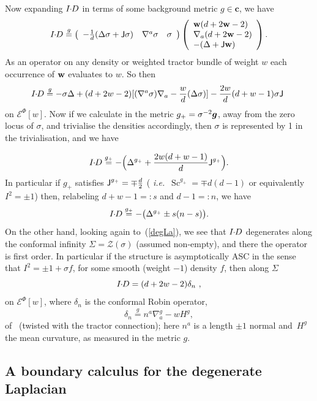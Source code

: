 \documentclass[a4paper,12pt]{amsart}
\def\g{g_+}
\def\Cal{\mathcal}
\newcommand{\J}{\mbox{\sf J}}
\newcommand{\cc}{\boldsymbol{c}}
\newcommand{\ce}{{\Cal E}}
\def\bg{\mbox{\boldmath $g$}}
\newcommand{\si}{\sigma}
\theoremstyle{remark}
\newcommand{\nn}[1]{(\ref{#1})}
\newcommand{\Sc}{\operatorname{Sc}}
\def\sideremark#1{\ifvmode\leavevmode\fi\vadjust{\vbox to0pt{\vss%
 \hbox to 0pt{\hskip\hsize\hskip1em%
 \vbox{\hsize3cm\tiny\raggedright\pretolerance10000%
  \noindent #1\hfill}\hss}\vbox to8pt{\vfil}\vss}}}%
\newcommand{\edz}[1]{\sideremark{#1}}
\begin{document}
Now expanding $I\hspace*{-1mm} \cdot \hspace*{-1mm} D$ in terms of some background metric $g\in\cc$, we have 
$$
\ID \stackrel{g}{=}
\left(\begin{array}{rrr}
-\frac{1}{d}(\Delta \si +\J\si) & \nabla^a \si & \si
\end{array}\right)
\left(\begin{array}{lll}
\w (d+2\w-2) \\  \nabla_a ( d+2\w-2) \\ -(\Delta +\J \w)
\end{array}\right).
$$
As an operator on any density or weighted tractor bundle of weight $w$ each occurrence of $\mbox{\bf w}$ evaluates to $w$. 
So then 
\begin{equation}\label{degLa}
\ID \stackrel{g}{=} -\si \Delta
+(d+2w-2)[(\nabla^a \si)\nabla_a - \frac{w}{d} (\Delta \si)] -\frac{2w}{d}(d+w-1)\si \J~
\end{equation} on $\ce^\Phi [w]$.
Now if we calculate in the metric $\g=\si^{-2}\bg$, away from  the
zero locus of $\si$, and trivialise the densities accordingly,  then $\si$ is represented by 1 in the trivialisation, and we have

$$
\ID \stackrel{\g}{=}-  \Big(\Delta^{\g} + \frac{2w(d+w-1)}{d}\J^{\g} \Big).
$$ In particular if $\g$ satisfies $\J^{\g}=\mp\frac{d}{2}$ ({\it
  i.e.}\ $\Sc^{\g}=\mp d(d-1)$ or equivalently $I^2=\pm 1$) then,
relabeling $d+w-1=:s$ and $d-1=:n$, we have
\begin{equation}\label{IdotDsc}
\ID \stackrel{\g}{=} -  \big(\Delta^{\g} \pm s(n-s) \big).
\end{equation}
On the other hand, looking again to~\nn{degLa}, we see that $I\hspace*{-1mm} \cdot \hspace*{-1mm} D$ degenerates along the conformal infinity 
$\Sigma = \mathcal{Z}(\si)$ (assumed non-empty), and there the operator  is
first order. In particular if the structure is asymptotically ASC in the 
sense that $I^2=\pm 1+ \si f$, for some smooth (weight $-1$) density $f$, then along $\Sigma$
$$
I\hspace*{-1mm} \cdot \hspace*{-1mm} D = (d+2w-2) \delta_n~,
$$
on $\ce^{\Phi}[w]$, where $\delta_n$  is the conformal Robin operator,
$$
\delta_n \stackrel{g}{=}  n^a\nabla^g_a - w H^g ,
$$
of~\cite{cherrier,BrGonon} (twisted with the tractor connection);
here $n^a$ is a length $\pm 1$ normal and~$H^g$ the mean curvature, as measured
in the metric $g$.


\subsection{A boundary calculus for the degenerate Laplacian}
\label{boundcalc}
\end{document}
